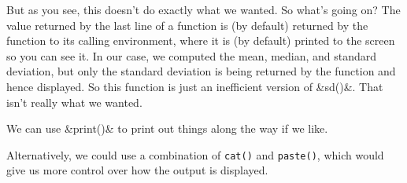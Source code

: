 But as you see, this doesn't do exactly what we wanted.  So what's going on?  
The value returned by the last line of a function is (by default) returned
by the function to its calling environment, where it is (by default) printed
to the screen so you can see it.  In our case, we computed the mean, median,
and standard deviation, but only the standard deviation is being returned 
by the function and hence displayed.  So this function is just an inefficient
version of &sd()&.  That isn't really what we wanted.

We can use &print()& to print out things along the way if we like.

\begin{knitrout}
\end{knitrout}


Alternatively, we could use a combination of \verb!cat()! and \verb!paste()!, which
would give us more control over how the output is displayed.
%
%


